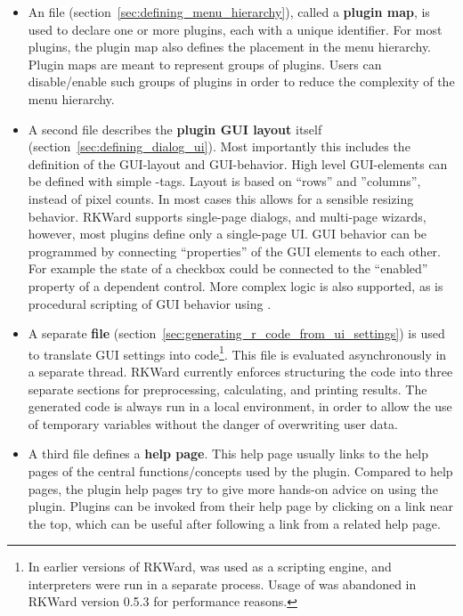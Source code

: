 \begin{itemize}
    \item
    An  file (section~\ref{sec:defining_menu_hierarchy}), 
    called a \textbf{plugin map}, is used to declare one or more plugins, each
    with a unique identifier. For most plugins, the plugin map also defines the
    placement in the menu hierarchy. Plugin maps are meant to represent groups of
    plugins. Users can disable/enable such groups of plugins in order to reduce the
    complexity of the menu hierarchy.

    \item
    A second  file describes the \textbf{plugin GUI layout} itself (section~\ref{sec:defining_dialog_ui}). 
    Most importantly this includes
    the definition of the GUI-layout and GUI-behavior. High level GUI-elements can
    be defined with simple -tags. Layout is based on ``rows'' and ''columns'',
    instead of pixel counts. In most cases this allows for a sensible resizing
    behavior. RKWard supports single-page dialogs, and multi-page wizards, however,
    most plugins define only a single-page UI. GUI behavior can be programmed by
    connecting ``properties'' of the GUI elements to each other. For example the state
    of a checkbox could be connected to the ``enabled'' property of a dependent
    control. More complex logic is also supported, as is procedural scripting of GUI
    behavior using .

    \item
    A separate \textbf{ file} (section~\ref{sec:generating_r_code_from_ui_settings}) 
    is used to translate GUI settings into 
    code\footnote{
        In earlier versions of RKWard,  was used
        as a scripting engine, and  interpreters were run in a separate process.
        Usage of  was abandoned in RKWard version 0.5.3 for performance reasons.
    }. This  file is evaluated asynchronously in a separate thread. RKWard
    currently enforces structuring the code into three separate sections for
    preprocessing, calculating, and printing results. The generated code is always
    run in a local environment, in order to allow the use of temporary variables
    without the danger of overwriting user data.

    \item
    A third  file defines a \textbf{help page}. This help page usually links to the  help
    pages of the central functions/concepts used by the plugin. Compared to  help
    pages, the plugin help pages try to give more hands-on advice on using the
    plugin. Plugins can be invoked from their help page by clicking on a link near
    the top, which can be useful after following a link from a related help page.
\end{itemize}

